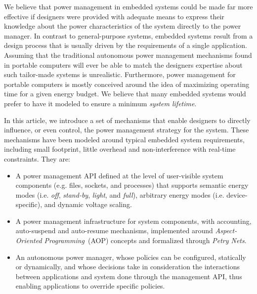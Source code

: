 We believe that power management in embedded systems could be made far
more effective if designers were provided with adequate means to express
their knowledge about the power characteristics of the system directly
to the power manager. In contrast to general-purpose systems, embedded
systems result from a design process that is usually driven by the
requirements of a single application. Assuming that the traditional
autonomous power management mechanisms found in portable computers will
ever be able to match the designers expertise about such tailor-made
systems is unrealistic. Furthermore, power management for portable
computers is mostly conceived around the idea of maximizing operating
time for a given energy budget. We believe that many embedded systems
would prefer to have it modeled to ensure a minimum \emph{system
  lifetime}.

In this article, we introduce a set of mechanisms that enable designers
to directly influence, or even control, the power management strategy
for the system. These mechanisms have been modeled around typical
embedded system requirements, including small footprint, little overhead
and non-interference with real-time constraints. They are:

\begin{itemize}
\item A power management API defined at the level of user-visible system
  components (e.g. files, sockets, and processes) that supports semantic
  energy modes (i.e. \emph{off}, \emph{stand-by}, \emph{light}, and
  \emph{full}), arbitrary energy modes (i.e. device-specific), and
  dynamic voltage scaling.

\item A power management infrastructure for system components, with
  accounting, auto-suspend and auto-resume mechanisms, implemented
  around \emph{Aspect-Oriented Programming}~(AOP) concepts and
  formalized through \emph{Petry Nets}.

\item An autonomous power manager, whose policies can be configured,
  statically or dynamically, and whose decisions take in consideration
  the interactions between applications and system done through the
  management API, thus enabling applications to override specific
  policies.
\end{itemize}

